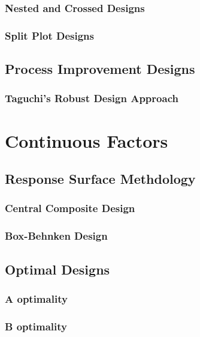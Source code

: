\subsubsection{Nested and Crossed Designs}

\subsubsection{Split Plot Designs}




\subsection{Process Improvement Designs}



\subsubsection{Taguchi's Robust Design Approach}



\section{Continuous Factors}



\subsection{Response Surface Methdology}
\label{sec:response_surface}

\subsubsection{Central Composite Design}

\subsubsection{Box-Behnken Design}

\subsection{Optimal Designs}

\subsubsection{A optimality}
\subsubsection{B optimality}
